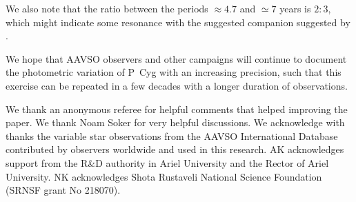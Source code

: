 \documentclass[twocolumn]{aastex62}
\begin{document}
We also note that the ratio between the periods $\approx 4.7$ and $\simeq 7$ years is $2:3$, which might indicate some resonance with the suggested companion suggested by \cite{Kashi2010}.

We hope that AAVSO observers and other campaigns will continue to document the photometric variation of P~Cyg with an increasing precision, such that this exercise can be repeated in a few decades with a longer duration of observations.


\vspace{0.5cm}
We thank an anonymous referee for helpful comments that helped improving the paper.
We thank Noam Soker for very helpful discussions.
We acknowledge with thanks the variable star observations from the AAVSO International Database contributed by observers worldwide and used in this research.
AK acknowledges support from the R\&D authority in Ariel University and the Rector of Ariel University.
NK acknowledges Shota Rustaveli National Science Foundation (SRNSF grant No 218070).
\end{document}
